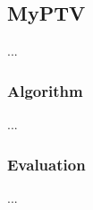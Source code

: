\subsection{MyPTV}
\label{sec:link2d:myptv}

...

\subsubsection{Algorithm}

...

\subsubsection{Evaluation}

...

